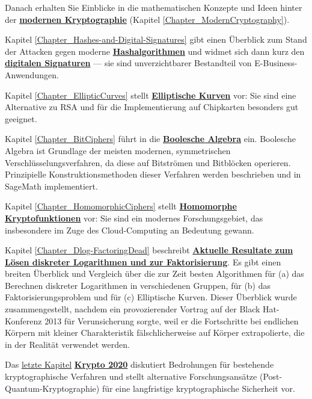 Danach erhalten Sie Einblicke in die mathematischen Konzepte und
Ideen hinter der \hyperlink{Chapter_ModernCryptography}{{\bf modernen Kryptographie}}
(Kapitel \ref{Chapter_ModernCryptography}).

Kapitel \ref{Chapter_Hashes-and-Digital-Signatures} gibt einen Überblick zum Stand der
Attacken gegen moderne \hyperlink{Chapter_Hashes-and-Digital-Signatures}{\bf Hashalgorithmen}
und widmet sich dann kurz den \hyperlink{Chapter_Hashes-and-Digital-Signatures}{\bf digitalen Signaturen}
--- sie sind unverzichtbarer Bestandteil von E-Business-Anwendungen.

Kapitel \ref{Chapter_EllipticCurves} stellt \hyperlink{Chapter_EllipticCurves}
{\bf Elliptische Kurven} vor: Sie sind eine Alternative zu RSA und für die
Implementierung auf Chipkarten besonders gut geeignet.

Kapitel \ref{Chapter_BitCiphers} führt in die \hyperlink{Chapter_BitCiphers}{\bf Boolesche Algebra} ein.
Boolesche Algebra ist Grundlage der meisten modernen, symmetrischen
Verschlüsselungsverfahren, da diese auf Bitströmen und Bitblöcken operieren.
Prinzipielle Konstruktionsmethoden dieser Verfahren werden beschrieben
und in SageMath implementiert.

Kapitel \ref{Chapter_HomomorphicCiphers} stellt
\hyperlink{Chapter_HomomorphicCiphers}{\bf Homomorphe Kryptofunktionen}
vor: Sie sind ein modernes Forschungsgebiet, das insbesondere im Zuge des
Cloud-Computing an Bedeutung gewann.

Kapitel \ref{Chapter_Dlog-FactoringDead} beschreibt
\hyperlink{Chapter_Dlog-FactoringDead}{\bf Aktuelle
Resultate zum Lösen diskreter Logarithmen und zur Faktorisierung}.
Es gibt einen breiten Überblick und Vergleich über die zur Zeit besten
Algorithmen für (a) das Berechnen diskreter Logarithmen in
verschiedenen Gruppen, für (b) das Faktorisierungsproblem und
für (c) Elliptische Kurven. Dieser Überblick wurde zusammengestellt,
nachdem ein provozierender Vortrag auf der Black Hat-Konferenz
2013 für Verunsicherung sorgte, weil er die Fortschritte bei endlichen
Körpern mit kleiner Charakteristik fälschlicherweise auf Körper
extrapolierte, die in der Realität verwendet werden.

Das \hyperlink{Chapter_Crypto2020}{letzte Kapitel}
\hyperlink{Chapter_Crypto2020}{\bf Krypto 2020}
diskutiert Bedrohungen für bestehende kryptographische Verfahren und
stellt alternative Forschungsansätze (Post-Quantum-Kryptographie)
für eine langfristige kryptographische Sicherheit vor.

